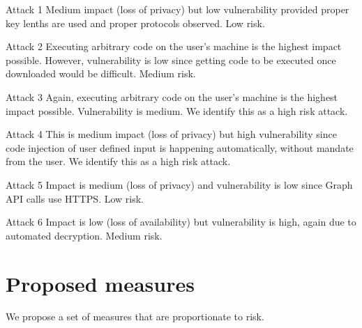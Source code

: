 \begin{desc}
    \item[Attack 1] Medium impact (loss of privacy) but low vulnerability provided proper key lenths are used and proper protocols observed. Low risk.

    \item[Attack 2] Executing arbitrary code on the user's machine is the highest impact possible. However, vulnerability is low since getting code to be executed once downloaded would be difficult. Medium risk.

    \item[Attack 3] Again, executing arbitrary code on the user's machine is the highest impact possible. Vulnerability is medium. We identify this as a high risk attack.

    \item[Attack 4] This is medium impact (loss of privacy) but high vulnerability since code injection of user defined input is happening automatically, without mandate from the user. We identify this as a high risk attack.

    \item[Attack 5] Impact is medium (loss of privacy) and vulnerability is low since Graph API calls use HTTPS. Low risk.

    \item[Attack 6] Impact is low (loss of availability) but vulnerability is high, again due to automated decryption. Medium risk.
\end{desc}



\section{Proposed measures}

We propose a set of measures that are proportionate to risk.

